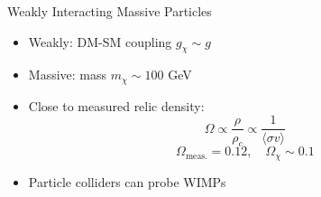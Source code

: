 \documentclass[aspectratio=169,xcolor=dvipsnames,,table,compress]{beamer}
\begin{document}
\begin{frame}
\begin{columns}[T]
\begin{column}{0.5\textwidth}
\begin{center}
        {Weakly Interacting Massive Particles}
      \end{center}
      \begin{itemize}
        \item Weakly: DM-SM coupling $g_\chi \sim g$ 
        \item Massive: mass $m_\chi \sim 100$ GeV
        \item Close to measured relic density:
          \[\Omega \propto  \frac{\rho}{\rho_{c}} \propto \frac{1}{\langle \sigma v \rangle} \]
          \[\Omega_\mathrm{meas.} = 0.12, \quad \Omega_\chi \sim 0.1\]
        \item Particle colliders can probe WIMPs
      \end{itemize}
    \end{column}
  \end{columns}
\end{frame}
\end{document}
